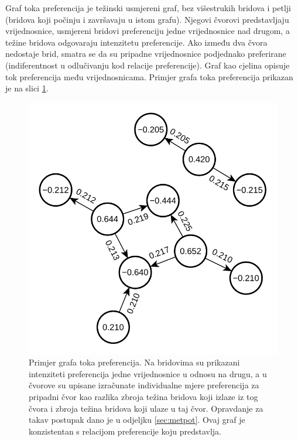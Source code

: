 \documentclass[lmodern, utf8, diplomski, numeric]{fer}
\begin{document}
  
  Graf toka preferencija je težinski usmjereni graf, bez višestrukih bridova i petlji (bridova koji počinju i završavaju u istom grafu).
  Njegovi čvorovi predstavljaju vrijednosnice, usmjereni bridovi preferenciju jedne vrijednosnice nad drugom, a težine bridova odgovaraju intenzitetu preferencije.
  Ako između dva čvora nedostaje brid, smatra se da su pripadne vrijednosnice podjednako preferirane (indiferentnost u odlučivanju kod relacije preferencije).
  Graf kao cjelina opisuje tok preferencija među vrijednosnicama.
  Primjer grafa toka preferencija prikazan je na slici \ref{fig:graph}.
  
  \begin{figure}[h]
    \centering
    \includegraphics[width=0.65\columnwidth]{graphics/pref-flow-graph.pdf}
    \caption{Primjer grafa toka preferencija. Na bridovima su prikazani intenziteti preferencija jedne vrijednosnice u odnosu na drugu, a u čvorove su upisane izračunate individualne mjere preferencija za pripadni čvor kao razlika zbroja težina bridova koji izlaze iz tog čvora i zbroja težina bridova koji ulaze u taj čvor. Opravdanje za takav postupak dano je u odjeljku \ref{sec:metpot}. Ovaj graf je konzistentan s relacijom preferencije koju predstavlja.}
    \label{fig:graph}
  \end{figure}
  
\end{document}
